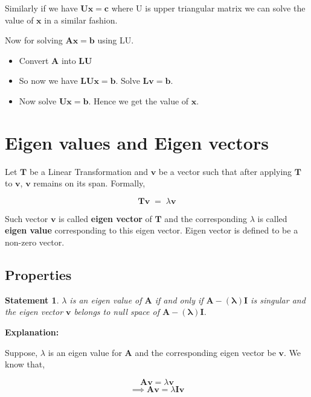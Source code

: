 \documentclass[a4paper]{article}
\newtheorem{statement}{Statement}
\begin{document}
    Similarly if we have $\mathbf{Ux = c}$
    where U is upper triangular matrix we can solve the value of $\mathbf{x}$ in a similar fashion. 
    
    Now for solving $\mathbf{Ax = b}$ using LU.
    \begin{itemize}
        \item Convert $\mathbf{A}$ into $\mathbf{LU}$
        \item So now we have $\mathbf{LUx = b}$. Solve $\mathbf{Lv = b}$.
        \item Now solve $\mathbf{Ux = b}$. Hence we get the value of $\mathbf{x}$. 
    \end{itemize}
        
        
        
\section{Eigen values and Eigen vectors}
    Let $\mathbf{T}$ be a Linear Transformation and $\mathbf{v}$ be a vector such that after applying $\mathbf{T}$ to $\mathbf{v}$, $\mathbf{v}$ remains on its span. Formally,
    
    \begin{equation*}
        \mathbf{Tv} \; = \; \lambda \mathbf{v}
    \end{equation*}
    
    Such vector $\mathbf{v}$ is called \textbf{eigen vector} of $\mathbf{T}$ and the corresponding $\lambda$ is called \textbf{eigen value} corresponding to this eigen vector. Eigen vector is defined to be a non-zero vector.
    
    \subsection{Properties}
    \begin{statement}
        $\lambda$ is an eigen value of  $\mathbf{A}$ if and only if $\mathbf{A-(\lambda)I}$ is singular and the eigen vector $\mathbf{v}$ belongs to null space of $\mathbf{A-(\lambda)I}$.
    \end{statement}
    
    \textbf{Explanation:}
    
        Suppose, $\lambda$ is an eigen value for $\mathbf{A}$ and the corresponding eigen vector be $\mathbf{v}$. We know that,
        
        \begin{equation*}
            \mathbf{Av} = \lambda\mathbf{v}
        \end{equation*}
        \begin{equation*}
            \implies \mathbf{Av} = \lambda\mathbf{I}\mathbf{v}
        \end{equation*}
        
\end{document}
